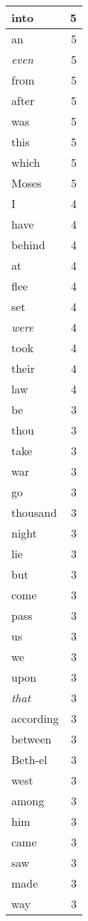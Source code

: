 \begin{center}
\begin{longtable}{l|r}
into & 5\\ \hline 
an & 5\\ \hline 
\emph{even} & 5\\ \hline 
from & 5\\ \hline 
after & 5\\ \hline 
was & 5\\ \hline 
this & 5\\ \hline 
which & 5\\ \hline 
Moses & 5\\ \hline 
I & 4\\ \hline 
have & 4\\ \hline 
behind & 4\\ \hline 
at & 4\\ \hline 
flee & 4\\ \hline 
set & 4\\ \hline 
\emph{were} & 4\\ \hline 
took & 4\\ \hline 
their & 4\\ \hline 
law & 4\\ \hline 
be & 3\\ \hline 
thou & 3\\ \hline 
take & 3\\ \hline 
war & 3\\ \hline 
go & 3\\ \hline 
thousand & 3\\ \hline 
night & 3\\ \hline 
lie & 3\\ \hline 
but & 3\\ \hline 
come & 3\\ \hline 
pass & 3\\ \hline 
us & 3\\ \hline 
we & 3\\ \hline 
upon & 3\\ \hline 
\emph{that} & 3\\ \hline 
according & 3\\ \hline 
between & 3\\ \hline 
Beth-el & 3\\ \hline 
west & 3\\ \hline 
among & 3\\ \hline 
him & 3\\ \hline 
came & 3\\ \hline 
saw & 3\\ \hline 
made & 3\\ \hline 
way & 3\\ \hline 

\end{longtable}
\end{center}
